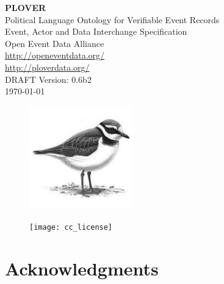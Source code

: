 \documentclass[11pt]{report}
\begin{document}

\vspace{-10pt}  

      \begin{center}
            {\Huge \bfseries PLOVER\ }\\[2ex] 
            {\LARGE Political Language Ontology for Verifiable Event Records\\ [2ex]Event, Actor and Data Interchange Specification}\\[10ex] 
            {\LARGE Open Event Data Alliance} \\[2ex] 
            {\Large \url{http://openeventdata.org/} }\\[2ex] 
            {\Large \url{http://ploverdata.org/} }\\[6ex]            
            {\LARGE DRAFT Version: 0.6b2\\ [2EX]\monthyeardate\today}
        \end{center}


\begin{figure}[h!]
\centering
\includegraphics[width=0.40\textwidth]{plover_icon}
\end{figure}

\vspace{20pt}   


\begin{figure}[h!]
\centering
\texttt{[image: cc\_license]}
\end{figure}






\chapter*{Acknowledgments}
\end{document}
